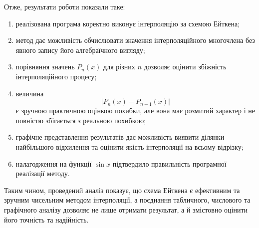 \documentclass[12pt,a4paper]{article}
\begin{document}
    Отже, результати роботи показали таке:
    \begin{enumerate}
        \item реалізована програма коректно виконує інтерполяцію за схемою Ейткена;
        \item метод дає можливість обчислювати значення інтерполяційного многочлена без явного запису його алгебраїчного вигляду;
        \item порівняння значень $P_n(x)$ для різних $n$ дозволяє оцінити збіжність інтерполяційного процесу;
        \item величина
        $$
        |P_n(x)-P_{n-1}(x)|
        $$
        є зручною практичною оцінкою похибки, але вона має розмитий характер і не повністю збігається з реальною похибкою;
        \item графічне представлення результатів дає можливість виявити ділянки найбільшого відхилення та оцінити якість інтерполяції на всьому відрізку;
        \item налагодження на функції $\sin x$ підтвердило правильність програмної реалізації методу.
    \end{enumerate}

    Таким чином, проведений аналіз показує, що схема Ейткена є ефективним та зручним чисельним методом інтерполяції, а поєднання табличного, числового та графічного аналізу дозволяє не лише отримати результат, а й змістовно оцінити його точність та надійність.
\end{document}
